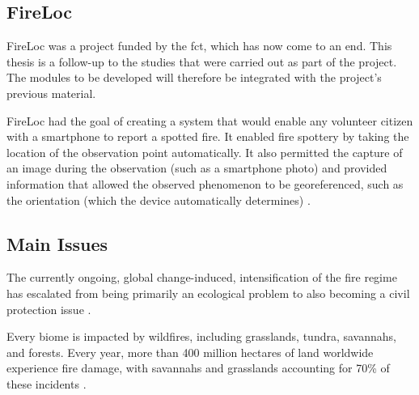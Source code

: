 \subsection{FireLoc}
\label{fireloc}
FireLoc was a project funded by the \gls{fct}, which has now come to an end. This thesis is a follow-up to the studies that were carried out as part of the project. The modules to be developed will therefore be integrated with the project's previous material.




FireLoc had the goal of creating a system that would enable any volunteer citizen with a smartphone to report a spotted fire. It enabled fire spottery by taking the location of the observation point automatically. It also permitted the capture of an image during the observation (such as a smartphone photo) and provided information that allowed the observed phenomenon to be georeferenced, such as the orientation (which the device automatically determines) \cite{silva2020fire, Fireloc2023}.




\subsection{Main Issues}
The currently ongoing, global change-induced, intensification of the fire regime has escalated from being primarily an ecological problem to also becoming a civil protection issue \cite{f12040469}. 


Every biome is impacted by wildfires, including grasslands, tundra, savannahs, and forests. Every year, more than 400 million hectares of land worldwide experience fire damage, with savannahs and grasslands accounting for 70\% of these incidents \cite{UNDESA2023}.


